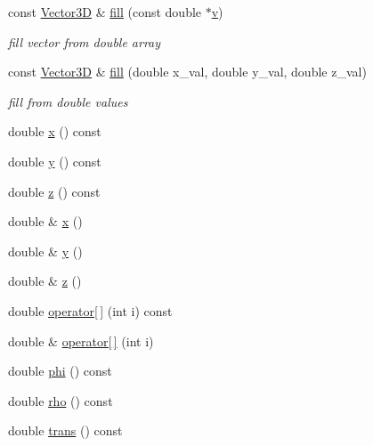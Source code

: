 \begin{DoxyCompactItemize}
const \hyperlink{class_d_d_surfaces_1_1_vector3_d}{Vector3D} \& \hyperlink{class_d_d_surfaces_1_1_vector3_d_a885f3dc7b3cfb7aea34c282b2ab01401}{fill} (const double $\ast$\hyperlink{_multi_view_8cpp_a8320ee13ac034dbf6d624fe8953dd337}{v})
\begin{DoxyCompactList}\small\item\em fill vector from double array \item\end{DoxyCompactList}\item 
const \hyperlink{class_d_d_surfaces_1_1_vector3_d}{Vector3D} \& \hyperlink{class_d_d_surfaces_1_1_vector3_d_a6576119c90b9e05b6046506de6b1f87e}{fill} (double x\_\-val, double y\_\-val, double z\_\-val)
\begin{DoxyCompactList}\small\item\em fill from double values \item\end{DoxyCompactList}\item 
double \hyperlink{class_d_d_surfaces_1_1_vector3_d_a5bd719fa589abb81c0516d64bb0845d5}{x} () const 
\item 
double \hyperlink{class_d_d_surfaces_1_1_vector3_d_a3bf128e592add1be24f212696e61462c}{y} () const 
\item 
double \hyperlink{class_d_d_surfaces_1_1_vector3_d_a1aaceadb3e209d24aa14e9bd8683f6df}{z} () const 
\item 
double \& \hyperlink{class_d_d_surfaces_1_1_vector3_d_a42067b3c5580bcb067a91e27c0c99352}{x} ()
\item 
double \& \hyperlink{class_d_d_surfaces_1_1_vector3_d_a0ff1549e1a9f987f22f84bc4e86605db}{y} ()
\item 
double \& \hyperlink{class_d_d_surfaces_1_1_vector3_d_a3318b2914eff5012a878d22c373e9e08}{z} ()
\item 
double \hyperlink{class_d_d_surfaces_1_1_vector3_d_a9bb1c34004ed33fb828eed6e5086988d}{operator\mbox{[}$\,$\mbox{]}} (int i) const 
\item 
double \& \hyperlink{class_d_d_surfaces_1_1_vector3_d_ae4e1eca62cf8f1cae89ab8b8e2f2f132}{operator\mbox{[}$\,$\mbox{]}} (int i)
\item 
double \hyperlink{class_d_d_surfaces_1_1_vector3_d_ae2bc1c0c08626818eda33bd2e7c6ace5}{phi} () const 
\item 
double \hyperlink{class_d_d_surfaces_1_1_vector3_d_a85a0cae7559e019ae6e9b905b2b190bb}{rho} () const 
\item 
double \hyperlink{class_d_d_surfaces_1_1_vector3_d_ab09f2ea031abe66c3d7c06e3cab478b5}{trans} () const 

\end{DoxyCompactItemize}

